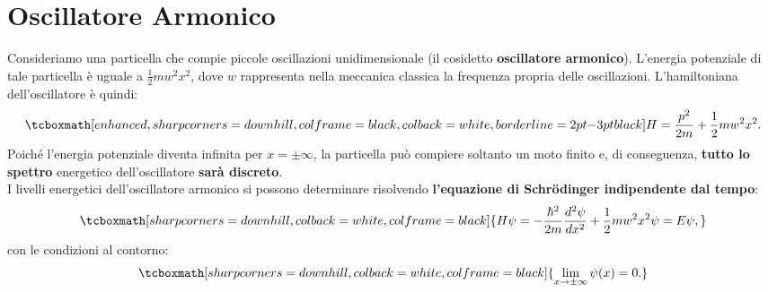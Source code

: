 \chapter[Oscillatore Armonico]{Oscillatore Armonico}
Consideriamo una particella che compie piccole oscillazioni unidimensionale (il cosidetto \textbf{oscillatore armonico}). L'energia potenziale di tale particella è uguale a $\frac{1}{2}mw^2x^2$, dove $w$ rappresenta nella meccanica classica la frequenza propria delle oscillazioni. L'hamiltoniana dell'oscillatore è quindi:
	\begin{equation}
		\tcboxmath[enhanced, sharp corners=downhill, colframe=black, colback=white, borderline={2pt}{-3pt}{black}]{
			H=\frac{p^2}{2m}+\frac{1}{2}mw^2x^2.
			}
	\label{eq:cap11_1}
	\end{equation}
Poiché l'energia potenziale diventa infinita per $x=\pm \infty$, la particella può compiere soltanto un moto finito e, di conseguenza,  \textbf{tutto lo spettro} energetico dell'oscillatore \textbf{sarà discreto}.\\

 I livelli energetici dell'oscillatore armonico si possono determinare risolvendo \textbf{l'equazione di Schr\"{o}dinger indipendente dal tempo}:
	\begin{equation}
		\tcboxmath[sharp corners=downhill, colback=white, colframe=black]{
			H\psi= -\frac{\hbar^2}{2m}\frac{d^2\psi}{dx^2}+\frac{1}{2}mw^2x^2\psi=E\psi,
			}
	\end{equation}
con le condizioni al contorno:
	\begin{equation}
		\tcboxmath[sharp corners=downhill, colback=white, colframe=black]{
			\lim _{x \rightarrow \pm \infty} \psi(x)=0.
			}
	\end{equation}\\
	
